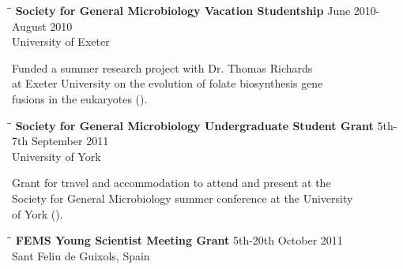 \documentclass{res}
\begin{document}
\begin{resume}
\vspace{-0.1in}  
   \begin{tabbing}
   \hspace{2in}\= \hspace{2.6in}\= \kill 
    {\bf Society for General Microbiology Vacation Studentship} \> \>June 2010-August 2010\\
                            \> 
                            \> University of Exeter\\

   \end{tabbing}\vspace{-40pt}     
   Funded a summer research project with Dr. Thomas Richards \\  at Exeter University on the evolution of folate biosynthesis gene \\fusions in the eukaryotes ().

\vspace{-0.1in}  
   \begin{tabbing}
   \hspace{2in}\= \hspace{2.6in}\= \kill
    {\bf Society for General Microbiology Undergraduate Student Grant} \> \> 5th-7th September 2011\\
                            \> 
                            \> University of York \\

   \end{tabbing}\vspace{-40pt}      
 Grant for travel and accommodation to attend and present at the\\ Society for General Microbiology summer conference at the University\\ of York (). 

\vspace{-0.1in}  
   \begin{tabbing}
   \hspace{2in}\= \hspace{2.6in}\= \kill 
    {\bf FEMS Young Scientist Meeting Grant} \> \> 5th-20th October 2011\\
                            \>  
                            \> Sant Feliu de Guixols, Spain \\
                       
   \end{tabbing}\vspace{-40pt}      


\end{resume}
\end{document}
